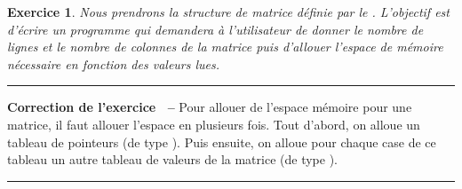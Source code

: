 \documentclass[a4paper]{article}
\newtheorem{Exo}{Exercice}
\newenvironment{Correction}{\par\tiny\blue\rule[1ex]{\textwidth}{1pt}\par\normalsize\textbf{Correction de l'exercice~\theExo{} -- }}{\par\tiny\blue\rule[1ex]{\textwidth}{1pt}\par}
\begin{document}
		\begin{Exo}
			Nous prendrons la structure de matrice définie par le .
			L'objectif est d'écrire un programme qui demandera à l'utilisateur de donner le nombre de lignes et le nombre de colonnes de la matrice puis d'allouer l'espace de mémoire nécessaire en fonction des valeurs lues.
		\end{Exo}
		\begin{Correction}
			Pour allouer de l'espace mémoire pour une matrice, il faut allouer l'espace en plusieurs fois.
			Tout d'abord, on alloue un tableau de pointeurs (de type ).
			Puis ensuite, on alloue pour chaque case de ce tableau un autre tableau de valeurs de la matrice (de type ).
		\end{Correction}
\end{document}
